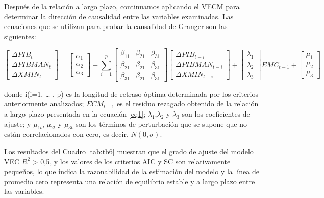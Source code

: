 \documentclass[11pt,]{article}
\begin{document}
Después de la relación a largo plazo, continuamos aplicando el VECM para
determinar la dirección de causalidad entre las variables examinadas.
Las ecuaciones que se utilizan para probar la causalidad de Granger son
las siguientes:

\begin{equation}
\begin{bmatrix}
\Delta PIB_{t}\\ 
\Delta PIBMAN_{t}\\ 
\Delta XMIN_{t}
\end{bmatrix}=
\begin{bmatrix}
\alpha _{1}\\ 
\alpha _{2}\\ 
\alpha _{3}
\end{bmatrix}+
\sum_{i=1}^{p}
\begin{bmatrix}
\beta_{11}  & \beta_{21}  & \beta_{31}\\ 
\beta_{21} &  \beta_{21}  & \beta_{31}\\ 
\beta_{31} &  \beta_{21}  & \beta_{31}
\end{bmatrix}
\begin{bmatrix}
\Delta PIB_{t-i}\\ 
\Delta PIBMAN_{t-i}\\ 
\Delta XMIN_{t-i}
\end{bmatrix}+
\begin{bmatrix}
\lambda _{1}\\ 
\lambda _{2}\\ 
\lambda _{3}
\end{bmatrix}EMC_{t-1}+
\begin{bmatrix}
\mu _{1}\\ 
\mu _{2}\\ 
\mu _{3}
\end{bmatrix}
\label{eq:eq4}
\end{equation}

donde i(i=1, \ldots{} , p) es la longitud de retraso óptima determinada
por los criterios anteriormente analizados; \({ECM}_{t-1}\) es el
residuo rezagado obtenido de la relación a largo plazo presentada en la
ecuación \ref{eq1}; \(\lambda_1\),\(\lambda_2\) y \(\lambda_3\) son los
coeficientes de ajuste; y \(\mu_{1t}\), \(\mu_{2t}\) y \(\mu_{3t}\) son
los términos de perturbación que se supone que no están correlacionados
con cero, es decir, \(N(0, \sigma)\).

Los resultados del Cuadro \ref{tab:tb6} muestran que el grado de ajuste
del modelo VEC \(R^2\) \textgreater{} 0,5, y los valores de los
criterios AIC y SC son relativamente pequeños, lo que indica la
razonabilidad de la estimación del modelo y la línea de promedio cero
representa una relación de equilibrio estable y a largo plazo entre las
variables.
\end{document}
